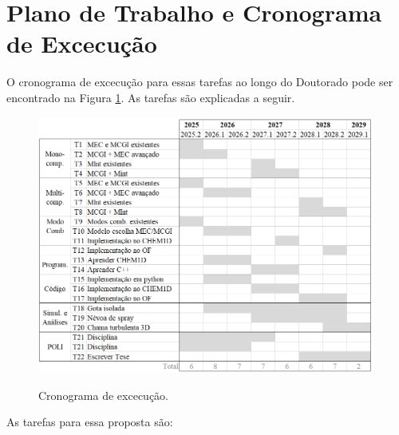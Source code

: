 \section{Plano de Trabalho e Cronograma de Excecução}

O cronograma de excecução para essas tarefas ao longo do Doutorado pode ser encontrado na Figura \ref{fig:cronograma}.
As tarefas são explicadas a seguir.

\begin{figure}[H]
    \centering
    \caption{Cronograma de excecução.}
    \includegraphics[width=0.99\textwidth]{30_images/cronograma-2.png}
    \label{fig:cronograma}
\end{figure}

As tarefas para essa proposta são:

